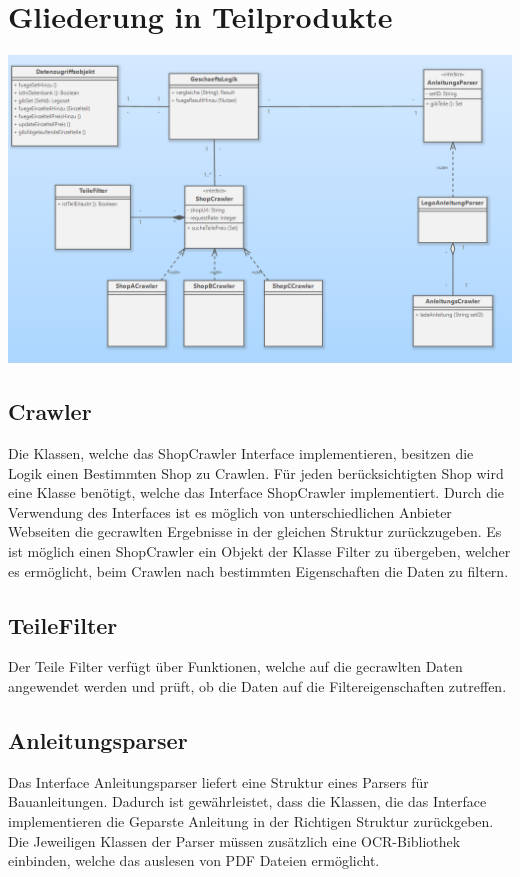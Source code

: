 \section{Gliederung in Teilprodukte}

\includegraphics[width=18cm]{pictures/Objektdiagramm.png}

\subsection{Crawler}
Die Klassen, welche das ShopCrawler Interface implementieren, besitzen die Logik einen Bestimmten Shop zu Crawlen. Für jeden berücksichtigten Shop wird eine Klasse benötigt, welche das Interface ShopCrawler implementiert.  Durch die Verwendung des Interfaces ist es möglich von unterschiedlichen Anbieter Webseiten die gecrawlten Ergebnisse in der gleichen Struktur zurückzugeben. Es ist möglich einen ShopCrawler ein Objekt der Klasse Filter zu übergeben, welcher es ermöglicht, beim Crawlen nach bestimmten Eigenschaften die Daten zu filtern.

\subsection{TeileFilter}
Der Teile Filter verfügt über Funktionen, welche auf die gecrawlten Daten angewendet werden und prüft, ob die Daten auf die Filtereigenschaften zutreffen.

\subsection{Anleitungsparser}
Das Interface Anleitungsparser liefert eine Struktur eines Parsers für Bauanleitungen. Dadurch ist gewährleistet, dass die Klassen, die das Interface implementieren die Geparste Anleitung in der Richtigen Struktur zurückgeben. Die Jeweiligen Klassen der Parser müssen zusätzlich eine OCR-Bibliothek einbinden, welche das auslesen von PDF Dateien ermöglicht. \newline 
\newline 
